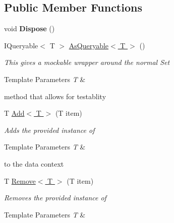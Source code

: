 \subsection*{Public Member Functions}
\begin{DoxyCompactItemize}
\item 
\hypertarget{class_highway_1_1_data_1_1_entity_framework_1_1_tests_1_1_unit_tests_1_1_commit_events_mock_context_a77b46a0f5ff19ce22ae5f32c0c5803d9}{void {\bfseries Dispose} ()}\label{class_highway_1_1_data_1_1_entity_framework_1_1_tests_1_1_unit_tests_1_1_commit_events_mock_context_a77b46a0f5ff19ce22ae5f32c0c5803d9}

\item 
I\-Queryable$<$ T $>$ \hyperlink{class_highway_1_1_data_1_1_entity_framework_1_1_tests_1_1_unit_tests_1_1_commit_events_mock_context_a26c4407162744d29a8493118c4ddafc5}{As\-Queryable$<$ T $>$} ()
\begin{DoxyCompactList}\small\item\em This gives a mockable wrapper around the normal Set
\begin{DoxyTemplParams}{Template Parameters}
{\em T} & \\
\hline
\end{DoxyTemplParams}
method that allows for testablity \end{DoxyCompactList}\item 
T \hyperlink{class_highway_1_1_data_1_1_entity_framework_1_1_tests_1_1_unit_tests_1_1_commit_events_mock_context_a097ee60302ada9299395df3fcd78e435}{Add$<$ T $>$} (T item)
\begin{DoxyCompactList}\small\item\em Adds the provided instance of 
\begin{DoxyTemplParams}{Template Parameters}
{\em T} & \\
\hline
\end{DoxyTemplParams}
to the data context \end{DoxyCompactList}\item 
T \hyperlink{class_highway_1_1_data_1_1_entity_framework_1_1_tests_1_1_unit_tests_1_1_commit_events_mock_context_afb983011c539bf41c5776e44284dbf91}{Remove$<$ T $>$} (T item)
\begin{DoxyCompactList}\small\item\em Removes the provided instance of 
\begin{DoxyTemplParams}{Template Parameters}
{\em T} & \\
\hline
\end{DoxyTemplParams}

\end{DoxyCompactList}
\end{DoxyCompactItemize}
